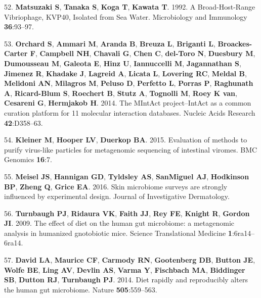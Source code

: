 \documentclass[12pt,]{article}
\begin{document}
\hypertarget{ref-Matsuzaki:1992gw}{}
52. \textbf{Matsuzaki S}, \textbf{Tanaka S}, \textbf{Koga T},
\textbf{Kawata T}. 1992. A Broad-Host-Range Vibriophage, KVP40, Isolated
from Sea Water. Microbiology and Immunology \textbf{36}:93--97.

\hypertarget{ref-Orchard:2014hq}{}
53. \textbf{Orchard S}, \textbf{Ammari M}, \textbf{Aranda B},
\textbf{Breuza L}, \textbf{Briganti L}, \textbf{Broackes-Carter F},
\textbf{Campbell NH}, \textbf{Chavali G}, \textbf{Chen C},
\textbf{del-Toro N}, \textbf{Duesbury M}, \textbf{Dumousseau M},
\textbf{Galeota E}, \textbf{Hinz U}, \textbf{Iannuccelli M},
\textbf{Jagannathan S}, \textbf{Jimenez R}, \textbf{Khadake J},
\textbf{Lagreid A}, \textbf{Licata L}, \textbf{Lovering RC},
\textbf{Meldal B}, \textbf{Melidoni AN}, \textbf{Milagros M},
\textbf{Peluso D}, \textbf{Perfetto L}, \textbf{Porras P},
\textbf{Raghunath A}, \textbf{Ricard-Blum S}, \textbf{Roechert B},
\textbf{Stutz A}, \textbf{Tognolli M}, \textbf{Roey K van},
\textbf{Cesareni G}, \textbf{Hermjakob H}. 2014. The MIntAct
project--IntAct as a common curation platform for 11 molecular
interaction databases. Nucleic Acids Research \textbf{42}:D358--63.

\hypertarget{ref-Kleiner:2015kd}{}
54. \textbf{Kleiner M}, \textbf{Hooper LV}, \textbf{Duerkop BA}. 2015.
Evaluation of methods to purify virus-like particles for metagenomic
sequencing of intestinal viromes. BMC Genomics \textbf{16}:7.

\hypertarget{ref-Meisel:2016iu}{}
55. \textbf{Meisel JS}, \textbf{Hannigan GD}, \textbf{Tyldsley AS},
\textbf{SanMiguel AJ}, \textbf{Hodkinson BP}, \textbf{Zheng Q},
\textbf{Grice EA}. 2016. Skin microbiome surveys are strongly influenced
by experimental design. Journal of Investigative Dermatology.

\hypertarget{ref-Turnbaugh:2009hf}{}
56. \textbf{Turnbaugh PJ}, \textbf{Ridaura VK}, \textbf{Faith JJ},
\textbf{Rey FE}, \textbf{Knight R}, \textbf{Gordon JI}. 2009. The effect
of diet on the human gut microbiome: a metagenomic analysis in humanized
gnotobiotic mice. Science Translational Medicine
\textbf{1}:6ra14--6ra14.

\hypertarget{ref-David:2014cl}{}
57. \textbf{David LA}, \textbf{Maurice CF}, \textbf{Carmody RN},
\textbf{Gootenberg DB}, \textbf{Button JE}, \textbf{Wolfe BE},
\textbf{Ling AV}, \textbf{Devlin AS}, \textbf{Varma Y},
\textbf{Fischbach MA}, \textbf{Biddinger SB}, \textbf{Dutton RJ},
\textbf{Turnbaugh PJ}. 2014. Diet rapidly and reproducibly alters the
human gut microbiome. Nature \textbf{505}:559--563.
\end{document}
